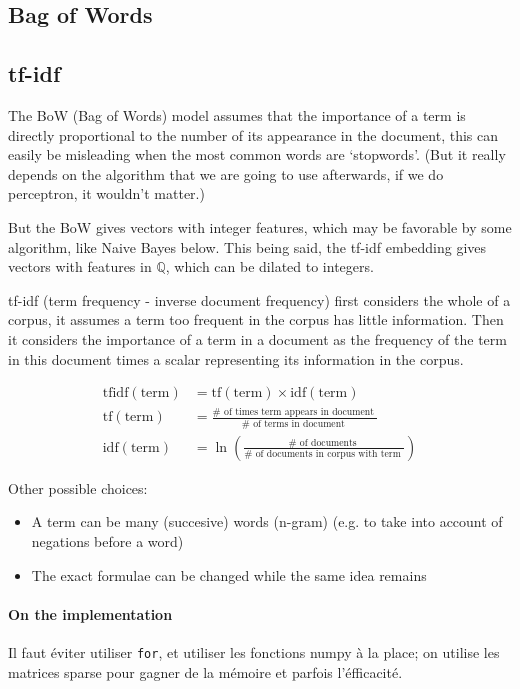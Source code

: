 \documentclass{article}
\begin{document}
\subsection{Bag of Words}

\subsection{tf-idf}

The BoW (Bag of Words) model assumes that the importance of a term is directly proportional to
the number of its appearance in the document, this can easily be misleading
when the most common words are `stopwords'. (But it really depends on
the algorithm that we are going to use afterwards, if we do perceptron, it wouldn't matter.)

But the BoW gives vectors with integer features, which may be favorable by some algorithm,
like Naive Bayes below. This being said, the tf-idf embedding gives vectors with features in $\mathbb{Q}$,
which can be dilated to integers.

tf-idf (term frequency - inverse document frequency) first considers
the whole of a corpus, it assumes a term too frequent in the corpus has little
information. Then it considers the importance of a term in a document
as the frequency of the term in this document times a scalar
representing its information in the corpus.

$$
\begin{aligned}
\mathrm{tfidf}(\mathrm{term}) & = \mathrm{tf}(\mathrm{term}) \times \mathrm{idf}(\mathrm{term}) \\
\mathrm{tf}(\mathrm{term}) & = \frac{\# \text { of times term appears in document }}{\# \text { of terms in document }} \\
\mathrm{idf}(\mathrm{term}) & =\ln \left(\frac{\# \text { of documents }}{\# \text { of documents in corpus with term }}\right)
\end{aligned}
$$

Other possible choices:

\begin{itemize}
  \item A term can be many (succesive) words (n-gram) (e.g. to
  take into account of negations before a word)
  \item The exact formulae can be changed while the same idea remains
\end{itemize}

\paragraph{On the implementation} Il faut éviter utiliser \verb|for|, et
utiliser les fonctions numpy à la place; on utilise les matrices sparse pour
gagner de la mémoire et parfois l'éfficacité.
\end{document}
